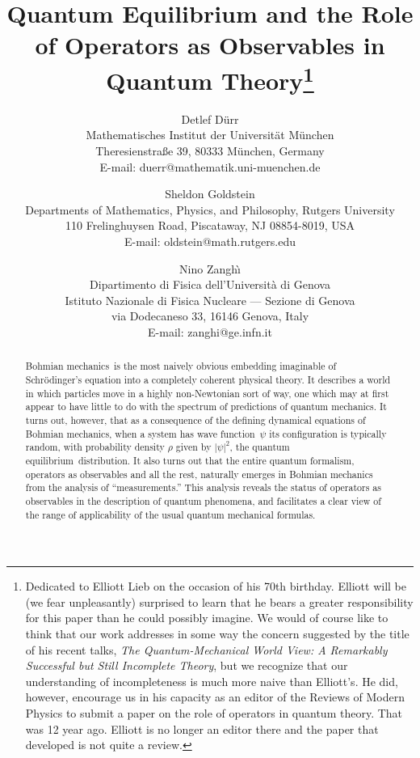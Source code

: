 \documentclass[12pt]{article}
\newcommand{\Sc}{Schr\"{o}dinger}
\newcommand{\BM}{Bohmian mechanics}
\newcommand{\qf}{quantum formalism}
\newcommand{\wf}{wave function}
\newcommand{\qe}{quantum equilibrium}
\begin{document}
\title{Quantum Equilibrium and the Role of Operators as Observables in
   Quantum Theory\footnote{Dedicated to Elliott Lieb on the occasion of
     his 70th birthday. Elliott will be (we fear unpleasantly) surprised
     to learn that he bears a greater responsibility for this paper
     than he could possibly imagine. We would of course like to think
     that our work addresses in some way the concern suggested by the
     title of his recent talks, {\it The Quantum-Mechanical World View:
       A Remarkably Successful but Still Incomplete Theory}, but we
     recognize that our understanding of incompleteness is much more
     naive than Elliott's. He did, however, encourage us in his capacity
     as an editor of the Reviews of Modern Physics to submit a paper on
     the role of operators in quantum theory.  That was 12 year ago.
     Elliott is no longer an editor there and the paper that developed
     is not quite a review.} }
\author{ Detlef  D\"{u}rr\\
   Mathematisches Institut der Universit\"{a}t M\"{u}nchen\\
   Theresienstra{\ss}e 39, 80333 M\"{u}nchen, Germany\\
   E-mail: duerr@mathematik.uni-muenchen.de \and
   Sheldon  Goldstein\\
   Departments of Mathematics, Physics, and Philosophy, Rutgers
   University\\
   110 Frelinghuysen Road, Piscataway, NJ 08854-8019, USA\\
   E-mail: oldstein@math.rutgers.edu \and
   Nino Zangh\`{\i}\\
   Dipartimento di Fisica dell'Universit\`a di Genova\\Istituto
   Nazionale di Fisica Nucleare
   --- Sezione di Genova\\
   via Dodecaneso 33, 16146 Genova, Italy\\
   E-mail: zanghi@ge.infn.it} \date{} \maketitle
\begin{abstract}
   \BM\ is the most naively obvious embedding imaginable of \Sc's
   equation into a completely coherent physical theory.  It describes a
   world in which particles move in a highly non-Newtonian sort of way,
   one which may at first appear to have little to do with the spectrum
   of predictions of quantum mechanics.  It turns out, however, that as
   a consequence of the defining dynamical equations of \BM, when a
   system has \wf\ $\psi$ its configuration is typically random, with
   probability density $\rho$ given by $|\psi|^2$, the \qe\
   distribution.  It also turns out that the entire \qf, operators as
   observables and all the rest, naturally emerges in Bohmian mechanics
   {}from the analysis of ``measurements.''  This analysis reveals the
   status of operators as observables in the description of quantum
   phenomena, and facilitates a clear view of the range of
   applicability of the usual quantum mechanical formulas.
\end{abstract}
\end{document}
